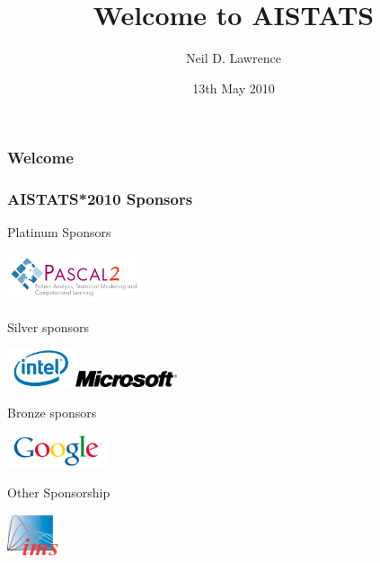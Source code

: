 \documentclass[english]{beamer}
\begin{document}
\title[Welcome]{Welcome to AISTATS}


\author[Neil D. Lawrence]{Neil D. Lawrence}




\date{13th May 2010}

\frame{\maketitle}


\begin{frame}
  \frametitle{Welcome}
  
  

\end{frame}
\begin{frame}
  \frametitle{AISTATS*2010 Sponsors}
  Platinum Sponsors\\
  \vspace{0.3cm}
  \centerline{\includegraphics[width=4cm]{./images/PASCAL2.png}}
  Silver sponsors\\
  \vspace{0.3cm}
  \centerline{\includegraphics[width=2cm]{./images/intel.jpg}\hspace{1cm}\includegraphics[width=3cm]{./images/Microsoft.png}}
  Bronze sponsors\\
  \vspace{0.3cm}
  \centerline{\includegraphics[width=3cm]{./images/GLogo1.png}}
  Other Sponsorship\\
  \vspace{0.3cm}
  \centerline{\includegraphics[width=1.5cm]{./images/imslogo8.png}}


\end{frame}
\end{document}
